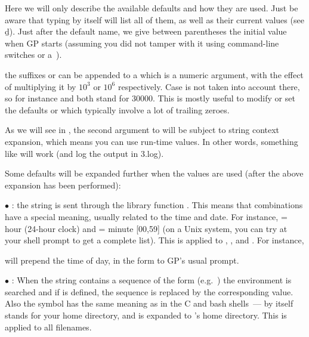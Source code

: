 Here we will only describe the available defaults and how they are used. Just
be aware that typing  by itself will list all of them, as well
as their current values (see \b{d}). Just after the default name, we give
between parentheses the initial value when GP starts (assuming you did not
tamper with it using command-line switches or a~).

 the suffixes  or  can be appended to a
 which is a numeric argument, with the effect of multiplying it
by $10^3$ or $10^6$ respectively. Case is not taken into account there, so
for instance  and  both stand for $30000$. This is mostly
useful to modify or set the defaults  or 
which typically involve a lot of trailing zeroes.

 As we will see in
, the second argument to  will be subject
to string context expansion, which means you can use run-time values. In
other words, something like  will work (and log the output in
3.log).

Some defaults will be expanded further when the values are used (after the
above expansion has been performed):

$\bullet$ : the string is sent through the library
function . This means that \kbd{\%} combinations have
a special meaning, usually related to the time and date. For instance,
 = hour (24-hour clock) and  = minute [00,59] (on a Unix
system, you can try  at your shell prompt to get a complete
list). This is applied to , , and . For
instance,


\noindent
will prepend the time of day, in the form 
to GP's usual prompt.

\unix $\bullet$ : When the string contains a
sequence of the form  (e.g.~) the
environment is searched and if  is defined, the sequence is
replaced by the corresponding value. Also the \kbd{\til} symbol has the
same meaning as in the C and bash shells~--- \kbd{\til} by itself stands
for your home directory, and  is expanded to 's
home directory. This is applied to all filenames.

